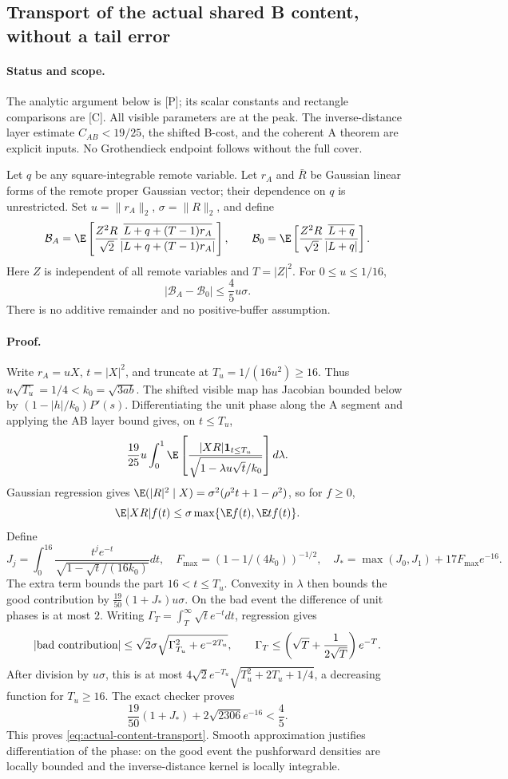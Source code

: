 \subsection{Transport of the actual shared B content, without a tail error}
\paragraph{Status and scope.} The analytic argument below is \textup{[P]}; its
scalar constants and rectangle comparisons are \textup{[C]}. All visible
parameters are at the peak. The inverse-distance layer estimate
$C_{AB}<19/25$, the shifted B-cost, and the coherent A theorem are
explicit inputs. No Grothendieck endpoint follows without the full cover.

Let $q$ be any square-integrable remote variable. Let $r_A$ and $\bar R$
be Gaussian linear forms of the remote proper Gaussian vector; their
dependence on $q$ is unrestricted. Set $u=\|r_A\|_2$, $\sigma=\|R\|_2$,
and define
\[
 \mathcal B_A=\E\left[\frac{Z^2R}{\sqrt2}
  \frac{\overline{L+q+(T-1)r_A}}{|L+q+(T-1)r_A|}\right],\qquad
 \mathcal B_0=\E\left[\frac{Z^2R}{\sqrt2}
  \frac{\overline{L+q}}{|L+q|}\right].
\]
Here $Z$ is independent of all remote variables and $T=|Z|^2$.
For $0\le u\le1/16$,
\begin{equation}\label{eq:actual-content-transport}
 \boxed{|\mathcal B_A-\mathcal B_0|\le\frac45u\sigma.}
\end{equation}
There is no additive remainder and no positive-buffer assumption.

\paragraph{Proof.} Write $r_A=uX$, $t=|X|^2$, and truncate at
$T_u=1/(16u^2)\ge16$. Thus $u\sqrt{T_u}=1/4<k_0=\sqrt{3ab}$.
The shifted visible map has Jacobian bounded below by
$(1-|h|/k_0)P'(s)$. Differentiating the unit phase along the A segment
and applying the AB layer bound gives, on $t\le T_u$,
\[
 \frac{19}{25}u\int_0^1\E\left[
 \frac{|XR|\mathbf1_{t\le T_u}}{\sqrt{1-\lambda u\sqrt t/k_0}}
 \right]d\lambda.
\]
Gaussian regression gives
$\E(|R|^2\mid X)=\sigma^2(\rho^2t+1-\rho^2)$, so for $f\ge0$,
\[
 \E|XR|f(t)\le\sigma\max\{\E f(t),\E tf(t)\}.
\]
Define
\[
 J_j=\int_0^{16}\frac{t^je^{-t}}{\sqrt{1-\sqrt t/(16k_0)}}dt,
 \quad F_{\max}=(1-1/(4k_0))^{-1/2},\quad
 J_* =\max(J_0,J_1)+17F_{\max}e^{-16}.
\]
The extra term bounds the part $16<t\le T_u$. Convexity in $\lambda$
then bounds the good contribution by
$\frac{19}{50}(1+J_*)u\sigma$.
On the bad event the difference of unit phases is at most $2$.
Writing $\Gamma_T=\int_T^\infty\sqrt t e^{-t}dt$, regression gives
\[
 |\hbox{bad contribution}|\le\sqrt2\sigma
 \sqrt{\Gamma_{T_u}^2+e^{-2T_u}},\qquad
 \Gamma_T\le\left(\sqrt T+\frac1{2\sqrt T}\right)e^{-T}.
\]
After division by $u\sigma$, this is at most
$4\sqrt2e^{-T_u}\sqrt{T_u^2+2T_u+1/4}$, a decreasing function for
$T_u\ge16$. The exact checker proves
\[
 \frac{19}{50}(1+J_*)+2\sqrt{2306}e^{-16}<\frac45.
\]
This proves \eqref{eq:actual-content-transport}. Smooth approximation
justifies differentiation of the phase: on the good event the
pushforward densities are locally bounded and the inverse-distance
kernel is locally integrable.

